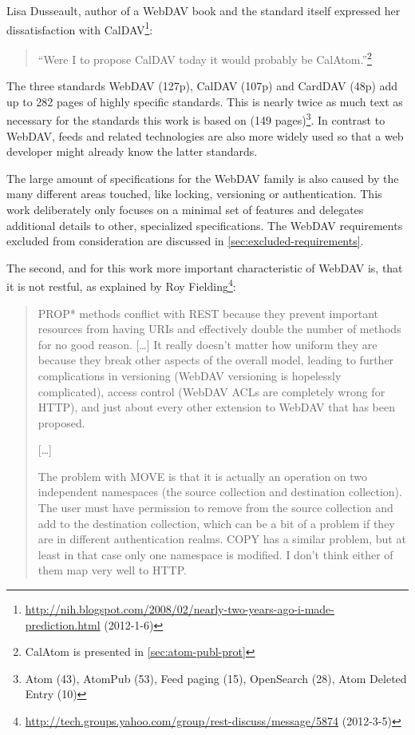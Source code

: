 \documentclass[11pt,a4paper,headsepline,twoside]{scrartcl}		%
\newcommand{\citeurl}[2]{\url{#1} (#2)}
\begin{document}
Lisa Dusseault, author of a WebDAV book \cite{Dusseault2004} and the standard
itself expressed her dissatisfaction with
CalDAV\footnote{\citeurl{http://nih.blogspot.com/2008/02/nearly-two-years-ago-i-made-prediction.html}{2012-1-6}}:

\begin{quote}
``Were I to propose CalDAV today it would probably be CalAtom.''\footnote{CalAtom is presented in \autoref{sec:atom-publ-prot}}
\end{quote}

The three standards WebDAV (127p), CalDAV (107p) and CardDAV (48p) add up to 282
pages of highly specific standards. This is nearly twice as much text as
necessary for the standards this work is based on (149 pages)\footnote{Atom
  (43), AtomPub (53), Feed paging (15), OpenSearch (28), Atom Deleted Entry
  (10)}. In contrast to WebDAV, feeds and related technologies are also more
widely used so that a web developer might already know the latter standards.

The large amount of specifications for the WebDAV family is also caused by the
many different areas touched, like locking, versioning or authentication. This
work deliberately only focuses on a minimal set of features and delegates
additional details to other, specialized specifications. The WebDAV requirements
excluded from consideration are discussed in \ref{sec:excluded-requirements}.

The second, and for this work more important characteristic of WebDAV is, that it
is not restful, as explained by Roy
Fielding\footnote{\citeurl{http://tech.groups.yahoo.com/group/rest-discuss/message/5874}{2012-3-5}}:

\begin{quotation}
  PROP* methods conflict with REST because they prevent important resources from
  having URIs and effectively double the number of methods for no good
  reason. [\ldots] It really doesn't matter how uniform they are because they
  break other aspects of the overall model, leading to further complications in
  versioning (WebDAV versioning is hopelessly complicated), access control
  (WebDAV ACLs are completely wrong for HTTP), and just about every other
  extension to WebDAV that has been proposed.

  [\ldots]

  The problem with MOVE is that it is actually an operation on two independent
  namespaces (the source collection and destination collection). The user must
  have permission to remove from the source collection and add to the
  destination collection, which can be a bit of a problem if they are in
  different authentication realms. COPY has a similar problem, but at least in
  that case only one namespace is modified. I don't think either of them map
  very well to HTTP.
\end{quotation}
\end{document}
